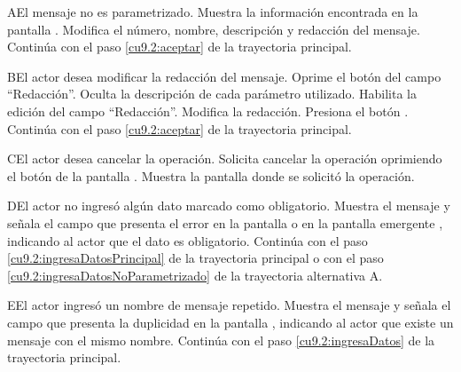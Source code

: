  
 \begin{UCtrayectoriaA}{A}{El mensaje no es parametrizado.}
	\UCpaso[\UCsist] Muestra la información encontrada en la pantalla .
	\UCpaso[\UCactor] Modifica el número, nombre, descripción y redacción del mensaje. \label{cu9.2:ingresaDatosNoParametrizado}
	\UCpaso[] Continúa con el paso \ref{cu9.2:aceptar} de la trayectoria principal.
 \end{UCtrayectoriaA}
 
 \begin{UCtrayectoriaA}{B}{El actor desea modificar la redacción del mensaje.}
 	 \UCpaso[\UCactor] Oprime el botón \btnEditar del campo ``Redacción''.
 	\UCpaso[\UCsist] Oculta la descripción de cada parámetro utilizado.
 	\UCpaso[\UCsist] Habilita la edición del campo ``Redacción''.
	\UCpaso[\UCactor] Modifica la redacción. 
	\UCpaso[\UCactor] Presiona el botón .
    \UCpaso[] Continúa con el paso \ref{cu9.2:aceptar} de la trayectoria principal.
 \end{UCtrayectoriaA}
 \begin{UCtrayectoriaA}{C}{El actor desea cancelar la operación.}
    \UCpaso[\UCactor] Solicita cancelar la operación oprimiendo el botón  de la pantalla .
    \UCpaso[\UCsist] Muestra la pantalla donde se solicitó la operación.
 \end{UCtrayectoriaA}
 \begin{UCtrayectoriaA}{D}{El actor no ingresó algún dato marcado como obligatorio.}
    \UCpaso[\UCsist] Muestra el mensaje  y señala el campo que presenta el error en la pantalla 
	     o en la pantalla emergente , indicando al actor que el dato es obligatorio.
    \UCpaso[] Continúa con el paso \ref{cu9.2:ingresaDatosPrincipal} de la trayectoria principal o con el paso \ref{cu9.2:ingresaDatosNoParametrizado} de la trayectoria alternativa A.
 \end{UCtrayectoriaA}
 \begin{UCtrayectoriaA}{E}{El actor ingresó un nombre de mensaje repetido.}
    \UCpaso[\UCsist] Muestra el mensaje  y señala el campo que presenta la duplicidad en la pantalla 
	    , indicando al actor que existe un mensaje con el mismo nombre.
    \UCpaso[] Continúa con el paso \ref{cu9.2:ingresaDatos} de la trayectoria principal.
 \end{UCtrayectoriaA}
 
